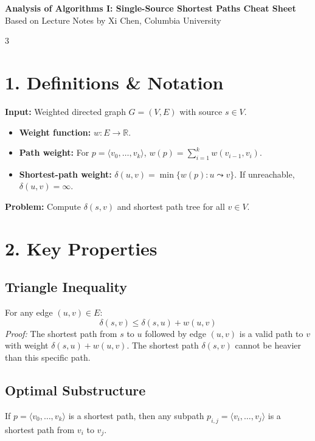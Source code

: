 \documentclass[10pt, a4paper, landscape]{article}
\begin{document}
\begin{center}
    {\Large \textbf{Analysis of Algorithms I: Single-Source Shortest Paths Cheat Sheet}} \\
    Based on Lecture Notes by Xi Chen, Columbia University
\end{center}

\begin{multicols}{3}

\section*{1. Definitions \& Notation}
\textbf{Input:} Weighted directed graph $G=(V, E)$ with source $s \in V$.
\begin{itemize}[leftmargin=*]
    \item \textbf{Weight function:} $w: E \to \mathbb{R}$.
    \item \textbf{Path weight:} For $p = \langle v_0, \dots, v_k \rangle$, $w(p) = \sum_{i=1}^k w(v_{i-1}, v_i)$.
    \item \textbf{Shortest-path weight:} $\delta(u, v) = \min \{ w(p) : u \leadsto v \}$. If unreachable, $\delta(u, v) = \infty$.
\end{itemize}

\textbf{Problem:} Compute $\delta(s, v)$ and shortest path tree for all $v \in V$.

\section*{2. Key Properties}
\subsection*{Triangle Inequality}
For any edge $(u, v) \in E$:
$$ \delta(s, v) \le \delta(s, u) + w(u, v) $$
\emph{Proof:} The shortest path from $s$ to $u$ followed by edge $(u, v)$ is a valid path to $v$ with weight $\delta(s, u) + w(u, v)$. The shortest path $\delta(s, v)$ cannot be heavier than this specific path.

\subsection*{Optimal Substructure}
If $p = \langle v_0, \dots, v_k \rangle$ is a shortest path, then any subpath $p_{i,j} = \langle v_i, \dots, v_j \rangle$ is a shortest path from $v_i$ to $v_j$.


\end{multicols}
\end{document}
